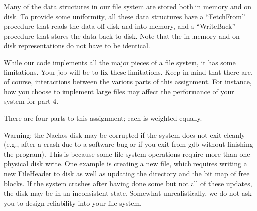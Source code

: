 Many of the data structures in our file system are
stored both in memory and on disk.  To provide some uniformity,
all these data structures
have a ``FetchFrom'' procedure that reads the data off disk and into memory,
and a ``WriteBack'' procedure that stores the data back to disk.
Note that the in memory and on disk representations do not have
to be identical.

While our code implements all the major pieces of a file system, it
has some limitations.  Your job will be to fix these limitations.
Keep in mind that there are, of course, interactions between the
various parts of this assignment.  For instance, how you choose
to implement large files may affect the performance of
your system for part 4.

There are four parts to this assignment; each is weighted equally.

Warning: the Nachos disk may be corrupted if the system does not 
exit cleanly (e.g., after a crash due
to a software bug or if you exit from gdb without finishing the program).
This is because some file system operations require more than one
physical disk write.  One example is creating a new file, which requires
writing a new FileHeader to disk as well as updating the directory 
and the bit map of free blocks.  If the system crashes after having
done some but not all of these updates, the disk may be in an inconsistent
state.  Somewhat unrealistically, we do not ask you to design
reliability into your file system.

